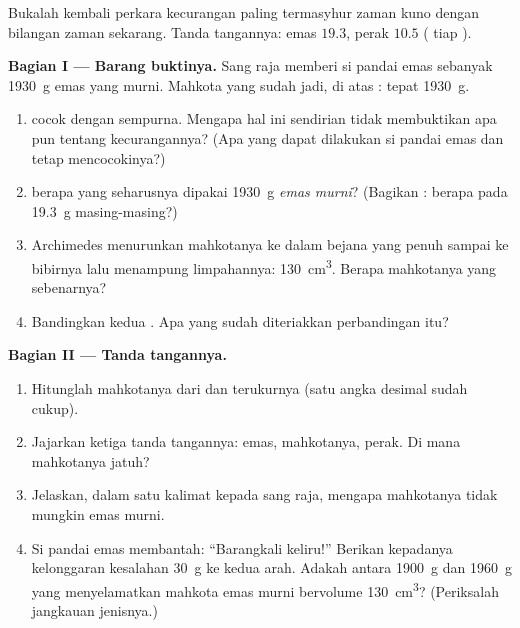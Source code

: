 \begin{problem}\label{pb:g6:density-floating:1}
Bukalah kembali perkara kecurangan paling termasyhur zaman kuno dengan
bilangan zaman sekarang. Tanda tangannya: emas $19.3$, perak $10.5$
( tiap ).

\medskip\noindent\textbf{Bagian I --- Barang buktinya.}
Sang raja memberi si pandai emas sebanyak \qty{1930}{g} emas yang
murni. Mahkota yang sudah jadi, di atas : tepat \qty{1930}{g}.
\begin{enumerate}
  \item {} cocok dengan sempurna. Mengapa hal ini sendirian
        tidak membuktikan apa pun tentang kecurangannya? (Apa yang
        dapat dilakukan si pandai emas dan tetap mencocokinya?)
  \item {} berapa yang seharusnya dipakai \qty{1930}{g}
        \emph{emas murni}? (Bagikan : berapa 
        pada \qty{19.3}{g} masing-masing?)
  \item Archimedes menurunkan mahkotanya ke dalam bejana yang penuh
        sampai ke bibirnya lalu menampung limpahannya:
        \qty{130}{cm^3}. Berapa  mahkotanya yang sebenarnya?
  \item Bandingkan kedua . Apa yang sudah diteriakkan
        perbandingan itu?
\end{enumerate}

\medskip\noindent\textbf{Bagian II --- Tanda tangannya.}
\begin{enumerate}[resume]
  \item Hitunglah  mahkotanya dari  dan 
        terukurnya (satu angka desimal sudah cukup).
  \item Jajarkan ketiga tanda tangannya: emas, mahkotanya, perak. Di
        mana mahkotanya jatuh?
  \item Jelaskan, dalam satu kalimat kepada sang raja, mengapa
        mahkotanya tidak mungkin emas murni.
  \item Si pandai emas membantah: ``Barangkali  keliru!''
        Berikan kepadanya kelonggaran kesalahan \qty{30}{g} ke kedua
        arah. Adakah  antara \qty{1900}{g} dan \qty{1960}{g}
        yang menyelamatkan mahkota emas murni bervolume
        \qty{130}{cm^3}? (Periksalah jangkauan  jenisnya.)
\end{enumerate}


\end{problem}
